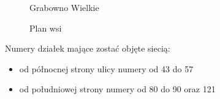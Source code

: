 	\begin{center}
		\begin{figure}[h!]
			\caption{Grabowno Wielkie}
			\label{fig:grabowno_intro}
			\begin{center}\cite{grabowno_intro}\end{center}
		\end{figure}
	
		\begin{figure}[h!]
			\caption{Plan wsi}
			\label{fig:plan_intro}
			\begin{center}\cite{plan_intro}\end{center}
		\end{figure}
	
	\end{center}

	Numery działek mające zostać objęte siecią:
	\begin{itemize}
		\item od północnej strony ulicy numery od 43 do 57
		\item od południowej strony numery od 80 do 90 oraz 121
	\end{itemize}
